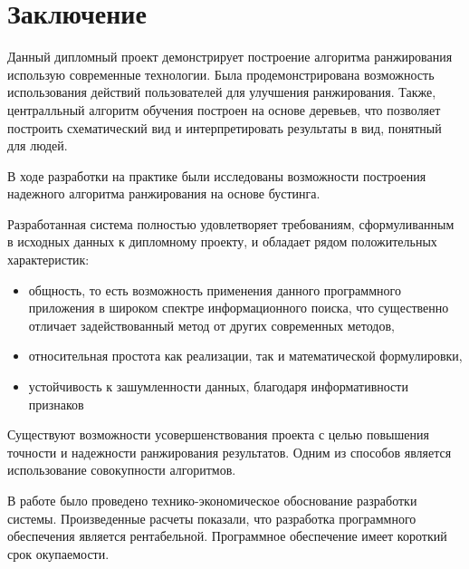 \section{Заключение}

Данный дипломный проект демонстрирует построение алгоритма ранжирования использую современные технологии. Была продемонстрирована возможность использования действий пользователей для улучшения ранжирования. Также, централльный алгоритм обучения построен на основе деревьев, что позволяет построить схематический вид и интерпретировать результаты в вид, понятный для людей.
 
В ходе разработки на практике были исследованы возможности построения надежного алгоритма ранжирования на основе бустинга.

Разработанная система полностью удовлетворяет требованиям, сформуливанным в исходных данных к дипломному проекту, и обладает рядом положительных характеристик:
\begin{itemize}
  \item общность, то есть возможность применения данного программного приложения в широком спектре информационного поиска, что существенно отличает задействованный метод от других современных методов,
  \item относительная простота как реализации, так и математической формулировки,
  \item устойчивость к зашумленности данных, благодаря информативности признаков
\end{itemize}

Существуют возможности усовершенствования проекта с целью повышения точности и надежности ранжирования результатов. Одним из способов является использование совокупности алгоритмов.

В работе было проведено технико-экономическое обоснование разработки системы. Произведенные расчеты показали, что разработка программного обеспечения является рентабельной. Программное обеспечение имеет короткий срок окупаемости.

\newpage